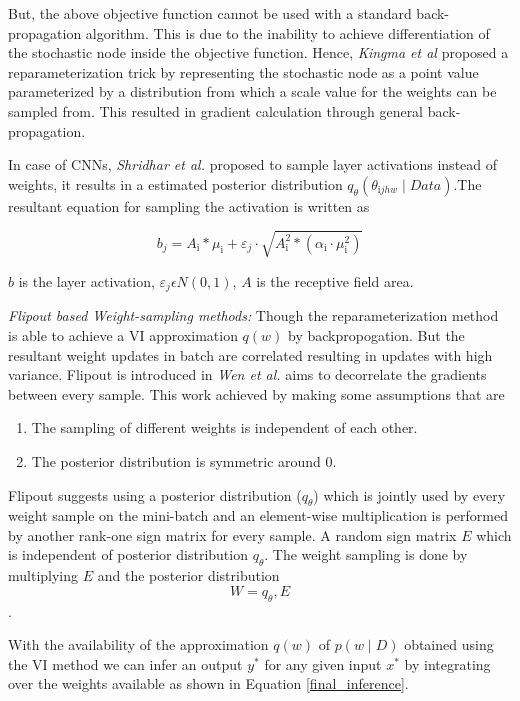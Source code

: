 \documentclass[10pt,twocolumn,letterpaper]{article}
\begin{document}
But, the above objective function cannot be used with a standard back-propagation algorithm. This is due to the inability to achieve differentiation of the stochastic node inside the objective function. Hence, \textit{Kingma et al} \cite{Kingma2015} proposed a reparameterization trick by representing the stochastic node as a point value parameterized by a distribution from which a scale value for the weights can be sampled from. This resulted in gradient calculation through general back-propagation. 

In case of CNNs, \textit{Shridhar et al.} proposed to sample layer activations instead of weights, it results in a estimated posterior distribution $q_{\theta}\left(\theta_{\mathrm{i} j h w} \mid D a t a\right)$.The resultant equation for sampling the activation is written as 
        
\begin{equation}b_{j}=A_{\mathrm{i}} * \mu_{\mathrm{i}}+\varepsilon_{j} \cdot \sqrt{A_{\mathrm{i}}^{2} *\left(\alpha_{\mathrm{i}} \cdot \mu_{\mathrm{i}}^{2}\right)}\end{equation}

$b$ is the layer activation, $\varepsilon_{j} \epsilon N(0,1)$, $ A $ is the receptive field area.

\textit{Flipout based Weight-sampling methods:}
Though the reparameterization method is able to achieve a VI approximation $q(w)$ by backpropogation. But the resultant weight updates in batch are correlated resulting in updates with high variance. Flipout is introduced in \textit{Wen et al.} aims to decorrelate the gradients between every sample. This work achieved by making some assumptions that are 
\begin{enumerate}
 \item The sampling of different weights is independent of each other. 
 \item The posterior distribution is symmetric around 0. 
\end{enumerate}

Flipout suggests using a posterior distribution ($q_{\theta}$) which is jointly used by every weight sample on the mini-batch and an element-wise multiplication is performed by another rank-one sign matrix for every sample. A random sign matrix $E$ which is independent of posterior distribution $q_{\theta}$. The weight sampling is done by multiplying $E$ and the posterior distribution $$W = q_{\theta}, E$$.

With the availability of the approximation $q(w)$ of $p(w \mid D)$ obtained using the VI method we can infer an output $y^{*}$ for any given input $x^{*}$ by integrating over the weights available as shown in Equation \ref{final_inference}.
\end{document}
